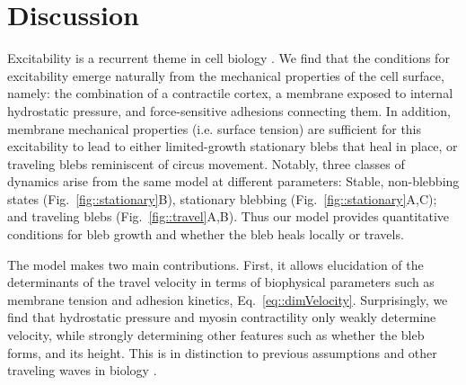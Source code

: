 

\section*{Discussion}



Excitability is a recurrent theme in cell biology \cite{Huang:2013ge,Xiong:2010fb,FitzHugh:1961il, bement2015activator}. We find that the conditions for excitability emerge naturally from the mechanical properties of the cell surface, namely: the combination of a contractile cortex, a membrane exposed to internal hydrostatic pressure, and force-sensitive adhesions connecting them. In addition, membrane mechanical properties (i.e. surface tension) are sufficient for this excitability to lead to either limited-growth stationary blebs that heal in place, or traveling blebs reminiscent of circus movement. Notably, three classes of dynamics arise from the same model at different parameters: Stable, non-blebbing states (Fig.~\ref{fig::stationary}B), stationary blebbing (Fig.~\ref{fig::stationary}A,C); and traveling blebs (Fig.~\ref{fig::travel}A,B). Thus our model provides quantitative conditions for bleb growth and whether the bleb heals locally or travels. 

The model makes two main contributions. First, it allows elucidation of the determinants of the travel velocity in terms of biophysical parameters such as membrane tension and adhesion kinetics, Eq.~\ref{eq::dimVelocity}. Surprisingly, we find that hydrostatic pressure and myosin contractility only weakly determine velocity, while strongly determining other features such as whether the bleb forms, and its height. This is in distinction to previous assumptions \cite{Lim:2012fz} and other traveling waves in biology \cite{Allard:2012if}. 


